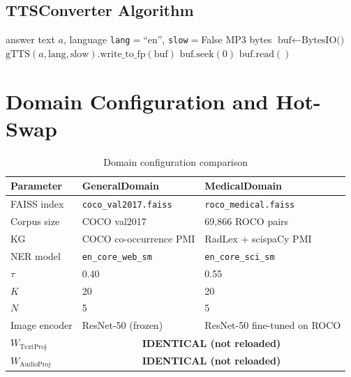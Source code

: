 \documentclass[12pt,a4paper]{article}
\theoremstyle{definition}
\theoremstyle{plain}
\theoremstyle{remark}
\begin{document}
\subsection{TTSConverter Algorithm}

\begin{algorithm}[H]
\caption{TTSConverter.convert (in-memory, no disk I/O)}
\label{alg:tts}
\begin{algorithmic}[1]
\Require answer text $a$, language \texttt{lang}$=$``en'', \texttt{slow}$=$False
\Ensure MP3 bytes
\State $\text{buf} \gets \text{BytesIO()}$ 
\State $\text{gTTS}(a, \text{lang}, \text{slow}).\text{write\_to\_fp}(\text{buf})$
\State $\text{buf.seek}(0)$ 
\State \Return $\text{buf.read}()$ 
\end{algorithmic}
\end{algorithm}

\newpage
\section{Domain Configuration and Hot-Swap}

\begin{table}[htbp]
\centering
\caption{Domain configuration comparison}
\begin{tabular}{lll}
\toprule
Parameter & GeneralDomain & MedicalDomain \\
\midrule
FAISS index & \texttt{coco\_val2017.faiss} & \texttt{roco\_medical.faiss} \\
Corpus size & COCO val2017 & 69,866 ROCO pairs \\
KG & COCO co-occurrence PMI & RadLex + scispaCy PMI \\
NER model & \texttt{en\_core\_web\_sm} & \texttt{en\_core\_sci\_sm} \\
$\tau$ & 0.40 & 0.55 \\
$K$ & 20 & 20 \\
$N$ & 5 & 5 \\
Image encoder & ResNet-50 (frozen) & ResNet-50 fine-tuned on ROCO \\
$W_{\text{TextProj}}$ & \multicolumn{2}{c}{\textbf{IDENTICAL (not reloaded)}} \\
$W_{\text{AudioProj}}$ & \multicolumn{2}{c}{\textbf{IDENTICAL (not reloaded)}} \\
\bottomrule
\end{tabular}
\end{table}
\end{document}
